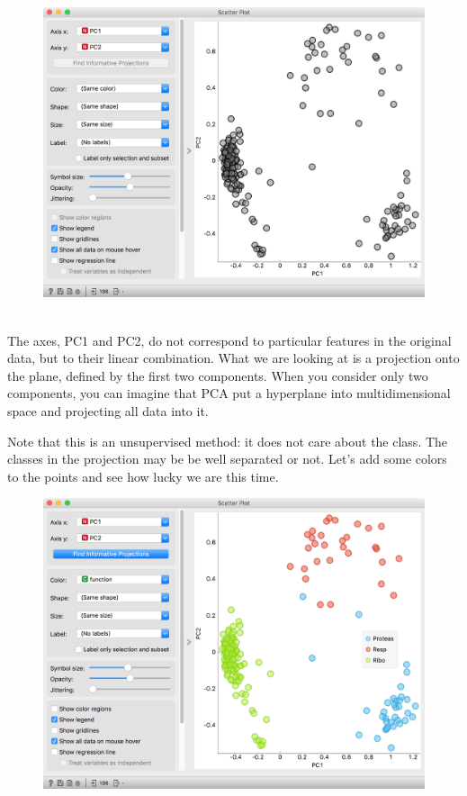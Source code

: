\begin{figure}[h!]
    \centering
    \includegraphics[width=\linewidth]{scatterplot-gray.png}
    \caption{$\;$}
\end{figure}

\newpage

The axes, PC1 and PC2, do not correspond to particular features in the original data, but to their linear combination. What we are looking at is a projection onto the plane, defined by the first two components. When you consider only two components, you can imagine that PCA put a hyperplane into multidimensional space and projecting all data into it.

Note that this is an unsupervised method: it does not care about the class. The classes in the projection may be be well separated or not. Let's add some colors to the points and see how lucky we are this time.

\begin{figure}[h]
    \centering
    \includegraphics[width=\linewidth]{scatterplot-color.png}
    \caption{$\;$}
\end{figure}

